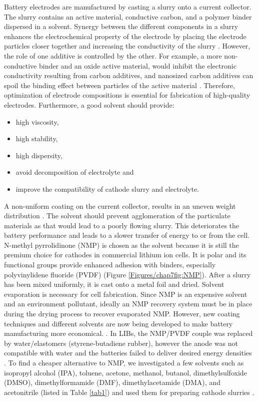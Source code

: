 Battery electrodes are manufactured by casting a slurry onto a current collector. The slurry contains an active material, conductive carbon, and a polymer binder dispersed in a solvent. Synergy between the different components in a slurry enhances the electrochemical property of the electrode by placing the electrode particles closer together and increasing the conductivity of the slurry \cite{zheng_cooperation_2012}.
However, the role of one additive is controlled by the other. For example, a more non-conductive binder and an oxide active material, would inhibit the electronic conductivity resulting from carbon additives, and nanosized carbon additives can spoil the binding effect between particles of the active material \cite{guy_novel_2006, seki_effect_2004}. Therefore, optimization of electrode compositions is essential for fabrication of high-quality electrodes. Furthermore, a good solvent should provide:
\begin{itemize}
    \item high viscosity,
    \item high stability,
    \item high dispersity,
    \item avoid decomposition of electrolyte and 
    \item improve the compatibility of cathode slurry and electrolyte.
\end{itemize}
A non-uniform coating on the current collector, results in an uneven weight distribution \cite{ludwig_solvent-free_2016}. The solvent should prevent agglomeration of the particulate materials as that would lead to a poorly flowing slurry. This deteriorates the battery performance and leads to a slower transfer of energy to or from the cell. N-methyl pyrrolidinone (NMP) is chosen as the solvent because it is still the premium choice for cathodes in commercial lithium ion cells. It is polar and its functional groups provide enhanced adhesion with binders, especially polyvinylidene fluoride (PVDF) (Figure \ref{Figures/chap7fig:NMP}). After a slurry has been mixed uniformly, it is cast onto a metal foil and dried. Solvent evaporation is necessary for cell fabrication. Since NMP is an expensive solvent and an environment pollutant, ideally an NMP recovery system must be in place during the drying process to recover evaporated NMP. However, new coating techniques and different solvents are now being developed to make battery manufacturing more economical. \cite{liu_effective_2014-1,spreafico_pvdf_2014-1, liu_effects_2008-1, lee_effect_2010-1, wenzel_challenges_2015, lee_selection_2017, stein_non-aqueous_2016}. In LIBs, the NMP/PVDF couple was replaced by water/elastomers (styrene-butadiene rubber), however the anode was not compatible with water and the batteries failed to deliver desired energy densities \cite{lee_novel_2007, li_effects_2005}. 
To find a cheaper alternative to NMP, we investigated a few solvents such as isopropyl alcohol (IPA), toluene, acetone, methanol, butanol, dimethylsulfoxide (DMSO), dimethylformamide (DMF), dimethylacetamide (DMA), and acetonitrile (listed in Table \ref{tab1}) and used them for preparing cathode slurries . 

